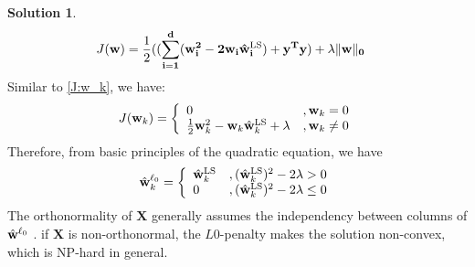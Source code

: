 \documentclass[a4paper,UTF8]{article}
\numberwithin{equation}{section}
\theoremstyle{definition}
\newtheorem*{solution}{Solution}
\begin{document}
\begin{solution}
\begin{equation}
\begin{split}
J(\mathbf{w})   &=  \frac{1}{2} (\mathbf{(\sum_{i=1}^{d} (w_i^2 - 2w_i \hat{\mathbf{w}}^{{\small \text{LS}}}_i) + y^Ty)	 + \lambda  \| \mathbf{w}\|_0  } 
\end{split}
\end{equation}
Similar to \eqref{J:w_k}, we have: 
\begin{equation} 
J(\mathbf{w}_k) = \left\{ \begin{array}{ll}
0  & ,\mathbf{w}_k = 0 \\
\frac{1}{2}  \mathbf{w}_k^2 - \mathbf{w}_k \hat{\mathbf{w}}^{{\small \text{LS}}}_k +  \lambda  &,\mathbf{w}_k \neq 0
 \end{array} \right.
\end{equation}
Therefore, from basic principles of the quadratic equation, we have
\begin{equation}
\hat{\mathbf{w}}^{\ell_0}_k = \left\{ \begin{array}{ll}
\hat{\mathbf{w}}^{{\small \text{LS}}}_k  &,  (\hat{\mathbf{w}}^{{\small \text{LS}}}_k)^2  - 2\lambda > 0 \\
0  								&,  (\hat{\mathbf{w}}^{{\small \text{LS}}}_k)^2  - 2\lambda \leq 0
  \end{array} \right.
\end{equation}
The orthonormality of $\mathbf{X}$ generally assumes the independency between columns of $\hat{\mathbf{w}}^{\ell_0}$ . if $\mathbf{X}$  is non-orthonormal,   the $L0$-penalty makes the solution non-convex,   which is NP-hard in general.
 \footnotemark   
~\\
~\\
\end{solution}

\end{document}
